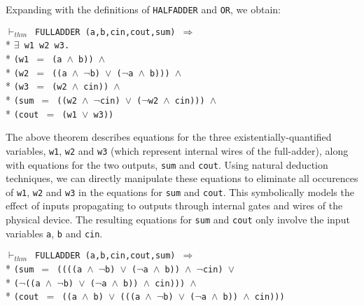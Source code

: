 \begin{normalsize}
Expanding with the definitions of \verb"HALFADDER" and \verb"OR",
we obtain:

\begin{minipage}{17cm}
$\vdash_{thm}$\verb" FULLADDER (a,b,cin,cout,sum) "$\Longrightarrow$\\*
$\exists$\verb" w1 w2 w3."\\*
\verb"(w1 "$=$\verb" (a "$\wedge$\verb" b)) "$\wedge$\\*
\verb"(w2 "$=$\verb" ((a "$\wedge$\verb" "$\neg$\verb"b) "$\vee$\verb" ("$\neg$\verb"a "$\wedge$\verb" b))) "$\wedge$\\*
\verb"(w3 "$=$\verb" (w2 "$\wedge$\verb" cin)) "$\wedge$\\*
\verb"(sum "$=$\verb" ((w2 "$\wedge$\verb" "$\neg$\verb"cin) "$\vee$\verb" ("$\neg$\verb"w2 "$\wedge$\verb" cin))) "$\wedge$\\*
\verb"(cout "$=$\verb" (w1 "$\vee$\verb" w3))"
\end{minipage}

The above theorem describes equations for the three existentially-quantified
variables, \verb"w1", \verb"w2" and \verb"w3" (which represent internal wires
of the full-adder), along with equations for the two outputs,
\verb"sum" and \verb"cout".
Using natural deduction techniques,
we can directly manipulate these equations
to eliminate all occurences of \verb"w1", \verb"w2" and \verb"w3"
in the equations for \verb"sum" and \verb"cout".
This symbolically models the effect of inputs propagating to outputs
through internal gates and wires of the physical device.
The resulting equations for \verb"sum" and \verb"cout"
only involve the input variables \verb"a", \verb"b" and \verb"cin".

\begin{minipage}{17cm}
$\vdash_{thm}$\verb" FULLADDER (a,b,cin,cout,sum) "$\Longrightarrow$\\*
\verb"(sum "$=$\verb" ((((a "$\wedge$\verb" "$\neg$\verb"b) "$\vee$\verb" ("$\neg$\verb"a "$\wedge$\verb" b)) "$\wedge$\verb" "$\neg$\verb"cin) "$\vee$\\*
\verb"("$\neg$\verb"((a "$\wedge$\verb" "$\neg$\verb"b) "$\vee$\verb" ("$\neg$\verb"a "$\wedge$\verb" b)) "$\wedge$\verb" cin))) "$\wedge$\\*
\verb"(cout "$=$\verb" ((a "$\wedge$\verb" b) "$\vee$\verb" (((a "$\wedge$\verb" "$\neg$\verb"b) "$\vee$\verb" ("$\neg$\verb"a "$\wedge$\verb" b)) "$\wedge$\verb" cin)))"
\end{minipage}


\end{normalsize}
